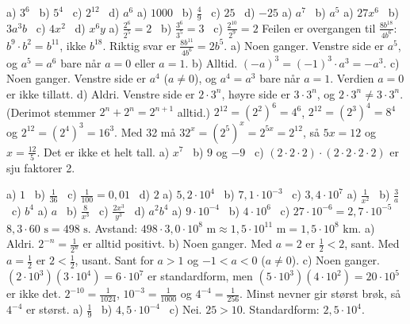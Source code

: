 
 a) $3^6$ \ b) $5^4$ \ c) $2^{12}$ \ d) $a^6$
 a) $1000$ \ b) $\frac{4}{9}$ \ c) $25$ \ d) $-25$
 a) $a^7$ \ b) $a^5$
 a) $27x^6$ \ b) $3a^3b$ \ c) $4x^2$ \ d) $x^6y$
 a) $\frac{2^6}{2^5} = 2$ \ b) $\frac{3^6}{3^5} = 3$ \ c) $\frac{2^{10}}{2^9} = 2$
 Feilen er overgangen til $\frac{8b^{18}}{4b^6}$: $b^9\cdot b^2=b^{11}$, ikke $b^{18}$. Riktig svar er $\frac{8b^{11}}{4b^6}=2b^5$.
 a) Noen ganger. Venstre side er $a^5$, og $a^5 = a^6$ bare når $a = 0$ eller $a = 1$.
b) Alltid. $(-a)^3 = (-1)^3\cdot a^3 = -a^3$.
c) Noen ganger. Venstre side er $a^4$ ($a\neq0$), og $a^4=a^3$ bare når $a=1$. Verdien $a=0$ er ikke tillatt.
d) Aldri. Venstre side er $2\cdot3^n$, høyre side er $3\cdot3^n$, og $2\cdot3^n\neq3\cdot3^n$. (Derimot stemmer $2^n+2^n=2^{n+1}$ alltid.)
 $2^{12}=(2^2)^6=4^6$, $2^{12}=(2^3)^4=8^4$ og $2^{12}=(2^4)^3=16^3$. Med 32 må $32^x=(2^5)^x=2^{5x}=2^{12}$, så $5x=12$ og $x=\frac{12}{5}$. Det er ikke et helt tall.
 a) $x^7$ \ b) $9$ og $-9$ \ c) $(2\cdot2\cdot2)\cdot(2\cdot2\cdot2\cdot2)$ er sju faktorer 2.

 a) $1$ \ b) $\frac{1}{36}$ \ c) $\frac{1}{100} = 0,01$ \ d) $2$
 a) $5,2 \cdot 10^4$ \ b) $7,1 \cdot 10^{-3}$ \ c) $3,4 \cdot 10^7$
 a) $\frac{1}{x^2}$ \ b) $\frac{3}{a}$ \ c) $b^4$
 a) $a$ \ b) $\frac{8}{x^3}$ \ c) $\frac{2x^3}{y^3}$ \ d) $a^2b^4$
 a) $9 \cdot 10^{-4}$ \ b) $4 \cdot 10^6$ \ c) $27 \cdot 10^{-6} = 2,7 \cdot 10^{-5}$
 $8,3 \cdot 60\text{ s} = 498\text{ s}$. Avstand: $498 \cdot 3,0 \cdot 10^8\text{ m} \approx 1,5 \cdot 10^{11}\text{ m} = 1,5 \cdot 10^8\text{ km}$.
 a) Aldri. $2^{-n}=\frac{1}{2^n}$ er alltid positivt.
b) Noen ganger. Med $a=2$ er $\frac12<2$, sant. Med $a=\frac12$ er $2<\frac12$, usant. Sant for $a>1$ og $-1<a<0$ ($a\neq0$).
c) Noen ganger. $(2\cdot10^3)(3\cdot10^4)=6\cdot10^7$ er standardform, men $(5\cdot10^3)(4\cdot10^2)=20\cdot10^5$ er ikke det.
 $2^{-10} = \frac{1}{1024}$, $10^{-3} = \frac{1}{1000}$ og $4^{-4} = \frac{1}{256}$.
Minst nevner gir størst brøk, så $4^{-4}$ er størst.
 a) $\frac{1}{9}$ \ b) $4,5 \cdot 10^{-4}$ \ c) Nei. $25 > 10$. Standardform: $2,5 \cdot 10^4$.

